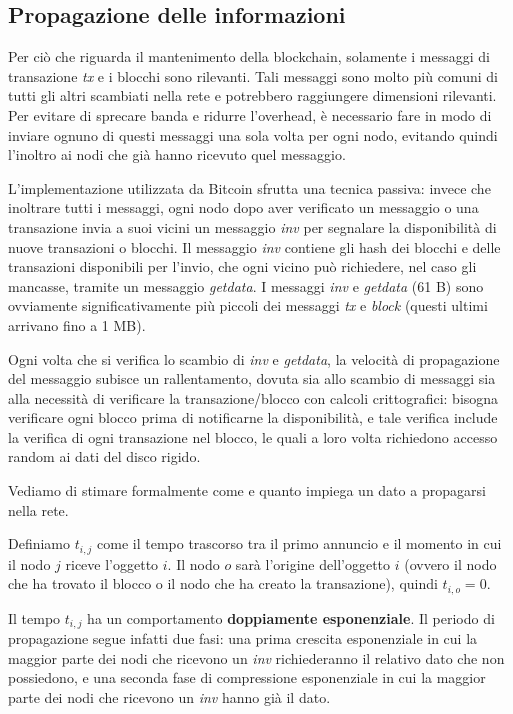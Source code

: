 \subsection{Propagazione delle informazioni}\label{propagazione-delle-informazioni}

Per ciò che riguarda il mantenimento della blockchain, solamente i messaggi di transazione \emph{tx} e i blocchi sono rilevanti. Tali messaggi sono molto più comuni di tutti gli altri scambiati nella rete e potrebbero raggiungere dimensioni rilevanti. Per evitare di sprecare banda e ridurre l'overhead, è necessario fare in modo di inviare ognuno di questi messaggi una sola volta per ogni nodo, evitando quindi l'inoltro ai nodi che già hanno ricevuto quel messaggio.

L'implementazione utilizzata da Bitcoin sfrutta una tecnica passiva: invece che inoltrare tutti i messaggi, ogni nodo dopo aver verificato un messaggio o una transazione invia a suoi vicini un messaggio \emph{inv} per segnalare la disponibilità di nuove transazioni o blocchi. Il messaggio \emph{inv} contiene gli hash dei blocchi e delle transazioni disponibili per l'invio, che ogni vicino può richiedere, nel caso gli mancasse, tramite un messaggio \emph{getdata}. I messaggi \emph{inv} e \emph{getdata} (61 B) sono ovviamente significativamente più piccoli dei messaggi \emph{tx} e \emph{block} (questi ultimi arrivano fino a 1 MB).

Ogni volta che si verifica lo scambio di \emph{inv} e \emph{getdata}, la velocità di propagazione del messaggio subisce un rallentamento, dovuta sia allo scambio di messaggi sia alla necessità di verificare la transazione/blocco con calcoli crittografici: bisogna verificare ogni blocco prima di notificarne la disponibilità, e tale verifica include la verifica di ogni transazione nel blocco, le quali a loro volta richiedono accesso random ai dati del disco rigido.

Vediamo di stimare formalmente come e quanto impiega un dato a propagarsi nella rete.

Definiamo $t_{i,j}$ come il tempo trascorso tra il primo annuncio e il momento in cui il nodo $j$ riceve l'oggetto $i$. Il nodo $o$ sarà l'origine dell'oggetto $i$ (ovvero il nodo che ha trovato il blocco o il nodo che ha creato la transazione), quindi $t_{i,o}=0$.

Il tempo $t_{i,j}$ ha un comportamento \textbf{doppiamente esponenziale}. Il periodo di propagazione segue infatti due fasi: una prima crescita esponenziale in cui la maggior parte dei nodi che ricevono un \emph{inv} richiederanno il relativo dato che non possiedono, e una seconda fase di compressione esponenziale in cui la maggior parte dei nodi che ricevono un \emph{inv} hanno già il dato.

